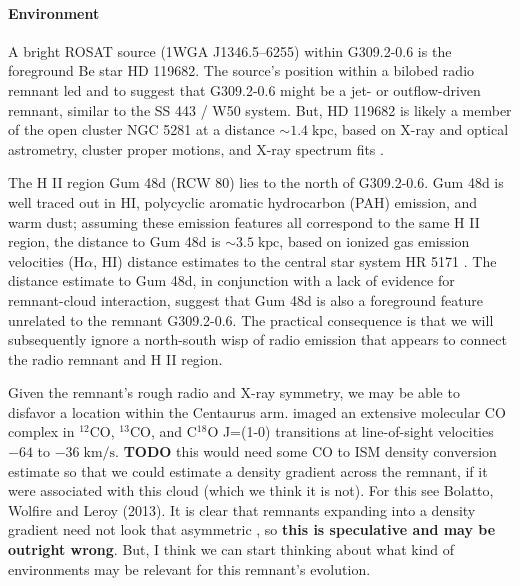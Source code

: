 \documentclass[preprint2,tighten,trackchanges]{aastex6}
\newcommand*{\mt}{\mathrm}
\newcommand*{\unit}[1]{\;\mt{#1}}  %
\newcommand*{\abt}{\mathord{\sim}} %
\newcommand*{\nH}{N_{\mathrm{H}}}
\begin{document}
\paragraph{Environment}

A bright ROSAT source (1WGA J1346.5--6255) within G309.2-0.6 is the foreground
Be star HD 119682.
The source's position within a bilobed radio remnant led
 and  to suggest that
G309.2-0.6 might be a jet- or outflow-driven remnant, similar to the SS 443 /
W50 system.
But, HD 119682 is likely a member of the open cluster NGC 5281 at a distance
$\abt 1.4 \unit{kpc}$, based on X-ray and optical astrometry, cluster proper
motions, and X-ray spectrum fits \citep{rakowski2006, safi-harb2007,
torrejon2013}.

The H II region Gum 48d (RCW 80) lies to the north of G309.2-0.6.
Gum 48d is well traced out in HI, polycyclic aromatic hydrocarbon (PAH)
emission, and warm dust; assuming these emission features all correspond to the
same H II region, the distance to Gum 48d is $\abt 3.5\unit{kpc}$, based on
ionized gas emission velocities (H$\alpha$, HI) distance estimates to the
central star system HR 5171 \citep{karr2009}.
The distance estimate to Gum 48d, in conjunction with a lack of evidence for
remnant-cloud interaction, suggest that Gum 48d is also a foreground feature
unrelated to the remnant G309.2-0.6.  The practical consequence is that we will
subsequently ignore a north-south wisp of radio emission that appears to
connect the radio remnant and H II region.

Given the remnant's rough radio and X-ray symmetry, we may be able to disfavor
a location within the Centaurus arm.  \citet{saito2001} imaged
an extensive molecular CO complex in ${}^{12}$CO, ${}^{13}$CO, and C${}^{18}$O
J=(1-0) transitions at line-of-sight velocities $-64$ to $-36 \unit{km/s}$.
\textbf{TODO} this would need some CO to ISM density conversion estimate so
that we could estimate a density gradient across the remnant, if it were
associated with this cloud (which we think it is not).
For this see Bolatto, Wolfire and Leroy (2013).
It is clear that remnants expanding into a density gradient need not look that
asymmetric \citep{williams2013}, so \textbf{this is speculative and may be
outright wrong}.
But, I think we can start thinking about what kind of environments may be
relevant for this remnant's evolution.
%
\end{document}
